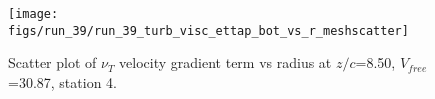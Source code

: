 \begin{figure}[H]
\centering
\texttt{[image: figs/run\_39/run\_39\_turb\_visc\_ettap\_bot\_vs\_r\_meshscatter]}
\caption{Scatter plot of $\nu_T$ velocity gradient term vs radius at $z/c$=8.50, $V_{free}$=30.87, station 4.}
\label{fig:run_39_turb_visc_ettap_bot_vs_r_meshscatter}
\end{figure}


